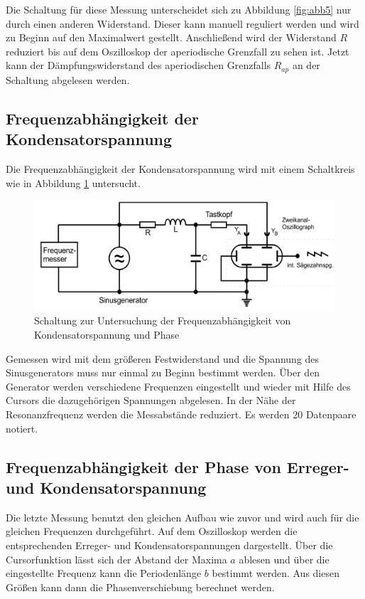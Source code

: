 Die Schaltung für diese Messung unterscheidet sich zu Abbildung \ref{fig:abb5} nur durch einen anderen Widerstand.
Dieser kann manuell reguliert werden und wird zu Beginn auf den Maximalwert gestellt.
Anschließend wird der Widerstand $R$ reduziert bis auf dem Oszilloskop der aperiodische Grenzfall zu sehen ist.
Jetzt kann der Dämpfungswiderstand des aperiodischen Grenzfalls $R_{ap}$ an der Schaltung abgelesen werden.

\subsection{Frequenzabhängigkeit der Kondensatorspannung}
\label{sec:AufgabeC}

Die Frequenzabhängigkeit der Kondensatorspannung wird mit einem Schaltkreis wie in Abbildung \ref{fig:abb6} untersucht.
\begin{figure}
  \centering
  \includegraphics[width=\textwidth]{abb6.jpg}
  \caption{Schaltung zur Untersuchung der Frequenzabhängigkeit von Kondensatorspannung und Phase\cite{manualV354}}
  \label{fig:abb6}
\end{figure}
Gemessen wird mit dem größeren Festwiderstand und die Spannung des Sinusgenerators muss nur einmal zu Beginn bestimmt werden.
Über den Generator werden verschiedene Frequenzen eingestellt und wieder mit Hilfe des Cursors die dazugehörigen Spannungen abgelesen.
In der Nähe der Resonanzfrequenz werden die Messabstände reduziert. Es werden 20 Datenpaare notiert.

\subsection{Frequenzabhängigkeit der Phase von Erreger- und Kondensatorspannung}
\label{sec:AufgabeD}

Die letzte Messung benutzt den gleichen Aufbau wie zuvor und wird auch für die gleichen Frequenzen durchgeführt.
Auf dem Oszilloskop werden die entsprechenden Erreger- und Kondensatorspannungen dargestellt.
Über die Cursorfunktion lässt sich der Abstand der Maxima $a$ ablesen und über die eingestellte Frequenz kann die Periodenlänge $b$ bestimmt werden.
Aus diesen Größen kann dann die Phasenverschiebung berechnet werden.
